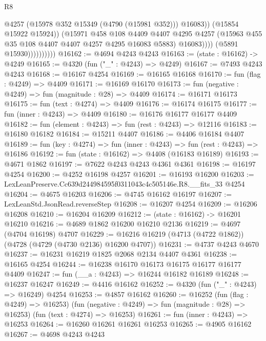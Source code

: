\begin{lexlean}{R8}
\begin{coremodule}
                                  @4257
                                  (@15978 @352 @15349 (@4790 (@15981 @352)))
                                  @16083))
                              (@15854 @15922 @15924))
                            (@15971
                              @458
                              @108
                              @4409
                              @4407
                              @4295
                              @4257
                              (@15963 @455 @35 @108 @4407 @4407 @4257 @4295 @16083 @5883)
                              @16083))))
                      (@5891 @15930))))))))))
@16162 := @4694 @4243 @4243
@16163 := (state : @16162) -> @4249
@16165 := @4320 (fun ("_" : @4243) => @4249)
@16167 := @7493 @4243 @4243
@16168 := @16167 @4254
@16169 := @16165 @16168
@16170 := fun (flag : @4249) => @4409
@16171 := @16169 @16170
@16173 := fun (negative : @4249) => fun (magnitude : @28) => @4409
@16174 := @16171 @16173
@16175 := fun (text : @4274) => @4409
@16176 := @16174 @16175
@16177 := fun (inner : @4243) => @4409
@16180 := @16176 @16177 @16177 @4409
@16182 := fun (element : @4243) => fun (rest : @4243) => @12116
@16183 := @16180 @16182
@16184 := @15211 @4407
@16186 := @4406 @16184 @4407
@16189 := fun (key : @4274) => fun (inner : @4243) => fun (rest : @4243) => @16186
@16192 := fun (state : @16162) => @4408 (@16183 @16189)
@16193 := @4671 @1862
@16197 := @7622 @4243 @4243 @4361 @4361
@16198 := @16197 @4254
@16200 := @4252 @16198 @4257
@16201 := @16193 @16200
@16203 := LexLeanPreserve.Cc639d244984595f0311043c4c505146e.R8.__fits_33 @4254
@16204 := @4675 @16203
@16206 := @4745 @16162 @16197
@16207 := LexLeanStd.JsonRead.reverseStep
@16208 := @16207 @4254
@16209 := @16206 @16208
@16210 := @16204 @16209
@16212 := (state : @16162) -> @16201 @16210
@16216 := @4689 @1862 @16200 @16210 @2136
@16219 := @4697 (@4704 @16198) @4707
@16229 := @16216 @16219 (@4713 (@4722 @1862)) (@4728 (@4729 (@4730 @2136) @16200 @4707))
@16231 := @4737 @4243 @4670
@16237 := @16231 @16219 @1825 @2068 @2134 @4407 @4361
@16238 := @16165 @4254
@16244 := @16238 @16170 @16173 @16175 @16177 @16177 @4409
@16247 := fun (__a : @4243) => @16244 @16182 @16189
@16248 := @16237 @16247
@16249 := @4416 @16162
@16252 := @4320 (fun ("_" : @4243) => @16249) @4254
@16253 := @4857 @16162
@16260 := @16252
    (fun (flag : @4249) => @16253)
    (fun (negative : @4249) => fun (magnitude : @28) => @16253)
    (fun (text : @4274) => @16253)
@16261 := fun (inner : @4243) => @16253
@16264 := @16260 @16261 @16261 @16253
@16265 := @4905 @16162
@16267 := @4698 @4243 @4243

\end{coremodule}
\end{lexlean}
